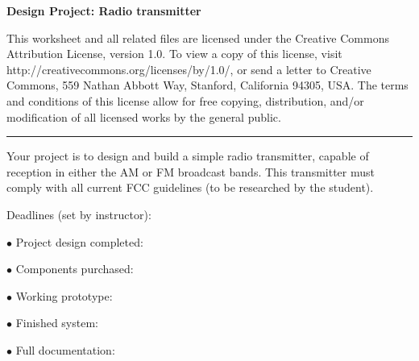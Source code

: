 
\centerline{\bf Design Project: Radio transmitter} \bigskip 
 
This worksheet and all related files are licensed under the Creative Commons Attribution License, version 1.0.  To view a copy of this license, visit http://creativecommons.org/licenses/by/1.0/, or send a letter to Creative Commons, 559 Nathan Abbott Way, Stanford, California 94305, USA.  The terms and conditions of this license allow for free copying, distribution, and/or modification of all licensed works by the general public.

\bigskip 

\hrule

\vskip 10pt

Your project is to design and build a simple radio transmitter, capable of reception in either the AM or FM broadcast bands.  This transmitter must comply with all current FCC guidelines (to be researched by the student).  

\vskip 10pt

\noindent
Deadlines (set by instructor):

\medskip
\item{$\bullet$} Project design completed: 
\item{$\bullet$} Components purchased:
\item{$\bullet$} Working prototype:
\item{$\bullet$} Finished system:
\item{$\bullet$} Full documentation:
\medskip



